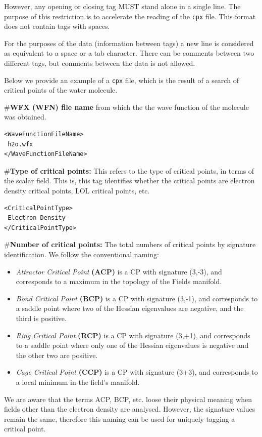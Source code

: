 However, any opening or closing tag MUST stand alone in a single line. The purpose of this restriction is to accelerate the reading of the \texttt{cpx} file. This format does not contain tags with spaces.

For the purposes of the data (information between tags) a new line is considered as equivalent to a space or a tab character. There can be comments between two different tags, but comments between the data is not allowed.

Below we provide an example of a \texttt{cpx} file, which is the result of a search of critical points of the water molecule.

\#\textbf{WFX (WFN) file name} from which the the wave function of the molecule was obtained.
\begin{verbatim}
<WaveFunctionFileName>
 h2o.wfx
</WaveFunctionFileName>
\end{verbatim}
\#\textbf{Type of critical points:} This refers to the type of critical points, in terms of the scalar field. This is, this tag identifies whether the critical points are electron density critical points, LOL critical points, etc.
\begin{verbatim}
<CriticalPointType>
 Electron Density
</CriticalPointType>
\end{verbatim}
\#\textbf{Number of critical points:} The total numbers of critical points by signature identification.
We follow the conventional naming:
\begin{itemize}
   \item \textit{Attractor Critical Point} \textbf{(ACP)} is a CP with signature (3,-3), and corresponds to a maximum in the topology of the Fields manifold.
   \item \textit{Bond Critical Point} \textbf{(BCP)} is a CP with signature (3,-1), and corresponds to a saddle point where two of the Hessian eigenvalues are negative, and the third is positive.
   \item \textit{Ring Critical Point} \textbf{(RCP)} is a CP with signature (3,+1), and corresponds to a saddle point where only one of the Hessian eigenvalues is negative and the other two are positive.
   \item \textit{Cage Critical Point} \textbf{(CCP)} is a CP with signature (3+3), and corresponds to a local minimum in the field's manifold.
\end{itemize}
We are aware that the terms ACP, BCP, etc. loose their physical meaning when fields other than the electron density are analysed. However, the signature values remain the same, therefore this naming can be used for uniquely tagging a critical point.
